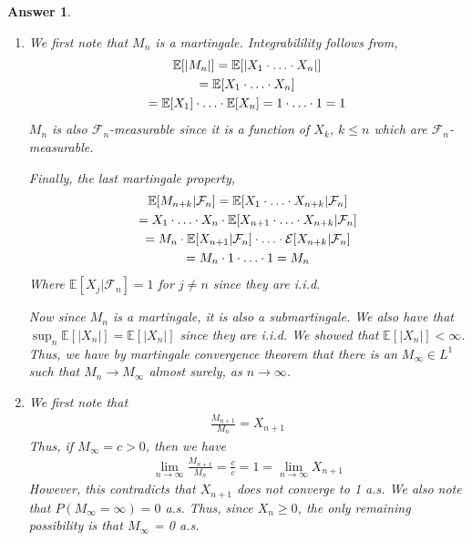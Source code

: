 \documentclass[12pt]{article}
\theoremstyle{colon}
\newtheorem*{answer}{Answer}
\begin{document}
\begin{answer}
  \leavevmode
  \begin{enumerate}[label=\alph*)]
    \item We first note that $M_n$ is a martingale. Integrabilility follows from,
      \begin{gather*}
        \mathbb{E}[ \lvert M_n \rvert] = \mathbb{E}[ \lvert X_1 \cdot \mathellipsis \cdot X_n \rvert] \\
        = \mathbb{E}[ X_1 \cdot \mathellipsis \cdot X_n ] \\
        = \mathbb{E}[X_1] \cdot \mathellipsis \cdot \mathbb{E}[X_n]
        = 1 \cdot \mathellipsis \cdot 1 = 1
      \end{gather*}
      $M_n$ is also $\mathcal{F}_n$-measurable since it is a function of $X_k$, $k \leq n$ which are $\mathcal{F}_n$-measurable.

      Finally, the last martingale property,
      \begin{gather*}
        \mathbb{E}[M_{n+k} | \mathcal{F}_n] = \mathbb{E}[X_1 \cdot \mathellipsis \cdot X_{n+k} | \mathcal{F}_n] \\
        = X_1 \cdot \mathellipsis \cdot X_n \cdot \mathbb{E}[X_{n+1} \cdot \mathellipsis \cdot X_{n+k} | \mathcal{F}_n] \\
        = M_n \cdot \mathbb{E}[X_{n+1} | \mathcal{F}_n] \cdot \mathellipsis \cdot \mathcal{E}[X_{n+k} | \mathcal{F}_n] \\
        = M_n \cdot 1 \cdot \mathellipsis \cdot 1 = M_n
      \end{gather*}
      Where $\mathbb{E}[X_j | \mathcal{F}_n] = 1$ for $j \neq n$ since they are i.i.d.

      Now since $M_n$ is a martingale, it is also a submartingale. We also have that $\sup_n \mathbb{E}[\lvert X_n \rvert] = \mathbb{E}[\lvert X_n \rvert]$ since they are i.i.d. We showed that $\mathbb{E}[\lvert X_n \rvert] < \infty$. Thus, we have by martingale convergence theorem that there is an $M_\infty \in L^1$ such that $M_n \rightarrow M_\infty$ almost surely, as $n \rightarrow \infty$.
    \item We first note that
      \begin{gather*}
        \frac{M_{n+1}}{M_n} = X_{n+1}
      \end{gather*}
      Thus, if $M_\infty = c > 0$, then we have
      \begin{gather*}
        \lim_{n \rightarrow \infty} \frac{M_{n+1}}{M_n} = \frac{c}{c} = 1 = \lim_{n \rightarrow \infty} X_{n+1}
      \end{gather*}
      However, this contradicts that $X_{n+1}$ does not converge to 1 a.s. We also note that $P(M_\infty = \infty) = 0$ a.s. Thus, since $X_n \geq 0$, the only remaining possibility is that $M_\infty$ = 0 a.s.
  \end{enumerate}
\end{answer}
\end{document}
